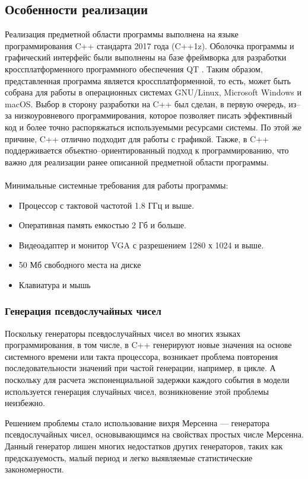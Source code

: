 \subsection{Особенности реализации}
Реализация предметной области программы выполнена на языке программирования C++ стандарта 2017 года (C++1z). Оболочка программы и графический интерфейс были выполнены на базе фреймворка для разработки кроссплатформенного программного обеспечения QT \cite{QtDoc}. Таким образом, представленная программа является кроссплатформенной, то есть, может быть собрана для работы в операционных системах GNU/Linux, Microsoft Windows и macOS. Выбор в сторону разработки на C++ был сделан, в первую очередь, из--за низкоуровневого программирования, которое позволяет писать эффективный код и более точно распоряжаться используемыми ресурсами системы. По этой же причине, C++ отлично подходит для работы с графикой. Также, в C++ поддерживается объектно--ориентированный подход к программированию, что важно для реализации ранее описанной предметной области программы.
\\\\
Минимальные системные требования для работы программы:
\begin{itemize}
	\item Процессор с тактовой частотой 1.8 ГГц и выше.
	\item Оперативная память емкостью 2 Гб и больше.
	\item Видеоадаптер и монитор VGA с разрешением 1280 х 1024 и выше.
	\item 50 Мб свободного места на диске
	\item Клавиатура и мышь
	\end{itemize}

\subsubsection{Генерация псевдослучайных чисел}
Поскольку генераторы псевдослучайных чисел во многих языках программирования, в том числе, в C++ генерируют новые значения на основе системного времени или такта процессора, возникает проблема повторения последовательности значений при частой генерации, например, в цикле. А поскольку для расчета экспоненциальной задержки каждого события в модели используется генерация случайных чисел, возникновение этой проблемы неизбежно.

Решением проблемы стало использование вихря Мерсенна --- генератора псевдослучайных чисел, основывающимся на свойствах простых числе Мерсенна. Данный генератор лишен многих недостатков других генераторов, таких как предсказуемость, малый период и легко выявляемые статистические закономерности.

